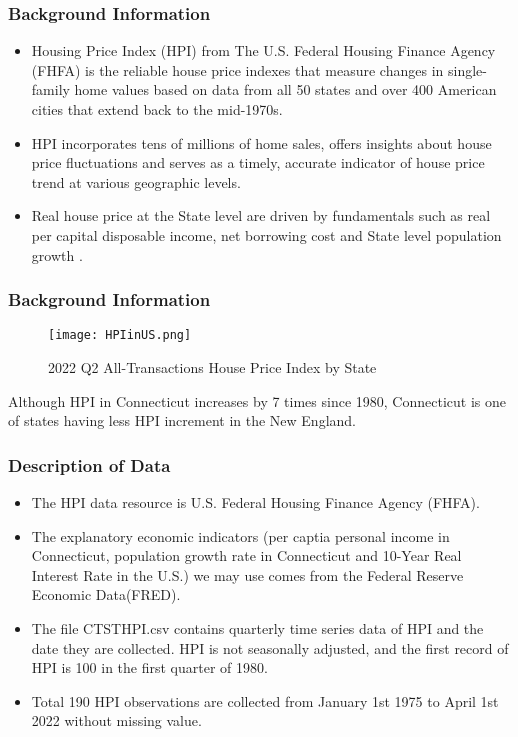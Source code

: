 \documentclass{beamer}
\begin{document}
\begin{frame}
\frametitle{Background Information}
    \begin{itemize}
    
    \item Housing Price Index (HPI) from The U.S. Federal Housing Finance Agency (FHFA) is the reliable house price indexes that measure changes in single-family home values based on data from all 50 states and over 400 American cities that extend back to the mid-1970s.
    
    \item HPI incorporates tens of millions of home sales, offers insights about house price fluctuations and serves as a timely, accurate indicator of house price trend at various geographic levels.
    
    \item Real house price at the State level are driven by fundamentals such as real per capital disposable income, net borrowing cost and State level population growth \cite{1}.
    
    \end{itemize}
\end{frame}

\begin{frame}
\frametitle{Background Information}
\begin{figure}
    \texttt{[image: HPIinUS.png]}
    \caption{2022 Q2 All-Transactions House Price Index by State\cite{2}}
    \printbibliography
\end{figure}
    Although HPI in Connecticut increases by 7 times since 1980, Connecticut is one of states having less HPI increment in the New England.
\end{frame}

\begin{frame}
\frametitle{Description of Data}
\begin{itemize}
    \item The HPI data resource is U.S. Federal Housing Finance Agency (FHFA\textregistered)\cite{2}.
    \item The explanatory economic indicators (per captia personal income in Connecticut\cite{3}, population growth rate in Connecticut and 10-Year Real Interest Rate in the U.S.\cite{4}) we may use comes from the Federal Reserve Economic Data(FRED\textregistered). 
    \item The file CTSTHPI.csv contains quarterly time series data of HPI and the date they are collected. HPI is not seasonally adjusted, and the first record of HPI is 100 in the first quarter of 1980.
    \item Total 190 HPI observations are collected from January 1st 1975 to April 1st 2022 without missing value. 
\end{itemize}
\end{frame}
\end{document}
